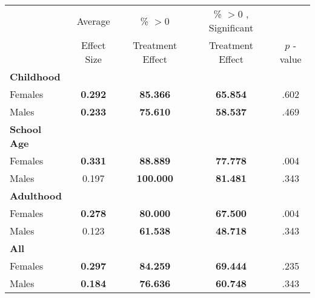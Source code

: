 \begin{tabular}{l c c c c}
\toprule
 & Average & \% $ >0 $ & \% $ >0 $ , Significant & \citet{Rosenbaum_2005_Distribution_JRSS} \\
 & Effect Size & Treatment Effect & Treatment Effect & $ p $ -value \\
\midrule
\textbf{Childhood} & & & & \\
\quad Females &  \textbf{    0.292} & \textbf{   85.366} & \textbf{   65.854} & .602 \\
\quad Males &  \textbf{    0.233} & \textbf{   75.610} & \textbf{   58.537} & .469 \\
\midrule
\textbf{School Age} & & & & \\
\quad Females &  \textbf{    0.331} & \textbf{   88.889} & \textbf{   77.778} & .004 \\
\quad Males &      0.197 & \textbf{  100.000} & \textbf{   81.481} & .343 \\
\midrule
\textbf{Adulthood} & & & & \\
\quad Females &  \textbf{    0.278} & \textbf{   80.000} & \textbf{   67.500} & .004 \\
\quad Males &      0.123 & \textbf{   61.538} & \textbf{   48.718} & .343 \\
\midrule
\textbf{All} & & & & \\
\quad Females &  \textbf{    0.297} & \textbf{   84.259} & \textbf{   69.444} & .235 \\
\quad Males &  \textbf{    0.184} & \textbf{   76.636} & \textbf{   60.748} & .343 \\
\bottomrule
\end{tabular}
